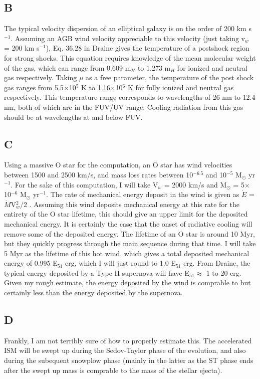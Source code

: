 \documentclass[a4paper]{article}
\begin{document}
\subsection{B}
The typical velocity dispersion of an elliptical galaxy is on the order of
200 km s$^{-1}$. Assuming an AGB wind velocity appreciable to this velocity
(just taking v$_w$ = 200 km s$^{-1}$), Eq. 36.28 in Draine gives the temperature
of a postshock region for strong shocks. This equation requires knowledge of the
mean molecular weight of the gas, which can range from 0.609 m$_H$ to 1.273 m$_H$
for ionized and neutral gas respectively. Taking $\mu$ as a free parameter,
the temperature of the post shock gas ranges from 5.5$\times$10$^{5}$ K to 
1.16$\times$10$^{6}$ K for fully ionized and neutral gas respectively. This
temperature range corresponds to wavelengths of 26 nm to 12.4 nm, both of 
which are in the FUV/UV range. Cooling radiation from this gas should
be at wavelengths at and below FUV.

\subsection{C}
Using a massive O star for the computation, an O star has wind velocities
between 1500 and 2500 km/s, and mass loss rates between 10$^{-6.5}$ and 
10$^{-5}$ M$_{\odot}$ yr$^{-1}$. For the sake of this computation, I will
take V$_{w}$ = 2000 km/s and M$_{\odot}$ = 5$\times$10$^{-6}$ M$_{\odot}$ yr$^{-1}$.
The rate of mechanical energy deposit in the wind is given as
$\dot{E}$ = $\dot{M}$V$_{w}^2$/2 . Assuming this wind deposits mechanical 
energy at this rate for the entirety of the O star lifetime, this should
give an upper limit for the deposited mechanical energy. It is certainly
the case that the onset of radiative cooling will remove some of the 
deposited energy. The lifetime of an O star is around 10 Myr, but they quickly
progress through the main sequence during that time. I will take 5 Myr as
the lifetime of this hot wind, which gives a total deposited mechanical energy
of 0.995 E$_{51}$ erg, which I will just round to 1.0 E$_{51}$ erg. From 
Draine, the typical energy deposited by a 
Type II supernova will have E$_{51} \approx$ 1 to 20
erg. Given my rough estimate, the energy deposited by the wind is comprable
to but certainly less than the energy deposited by the supernova. 

\subsection{D}
Frankly, I am not terribly sure of how to properly estimate this. The 
accelerated ISM will be swept up during the Sedov-Taylor phase of the evolution,
and also during the subequent snowplow phase (mainly in the latter as the ST
phase ends after the swept up mass is comprable to the mass of the stellar
ejecta). 
\end{document}
